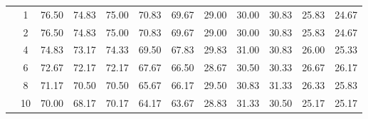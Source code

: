 \begin{table}[htpb]
\begin{tabular}{|c|c|c c c c c|c c c c c|}
\multicolumn{1}{|c|}{ \multirow{6}{*}{\rotatebox[origin=c]{90}{\textbf{K-vizinhos}}} }
&1 & 76.50	&74.83	&75.00	&70.83	&69.67	&29.00	&30.00	&30.83	&25.83	&24.67\\\cline{2-12}
&2 & 76.50	&74.83	&75.00	&70.83	&69.67	&29.00	&30.00	&30.83	&25.83	&24.67\\\cline{2-12}
&4 & 74.83	&73.17	&74.33	&69.50	&67.83	&29.83	&31.00	&30.83	&26.00	&25.33\\\cline{2-12}
&6 & 72.67	&72.17	&72.17	&67.67	&66.50	&28.67	&30.50	&30.33	&26.67	&26.17\\\cline{2-12}
&8 & 71.17	&70.50	&70.50	&65.67	&66.17	&29.50	&30.83	&31.33	&26.33	&25.83\\\cline{2-12}
&10 & 70.00	&68.17	&70.17	&64.17	&63.67	&28.83	&31.33	&30.50	&25.17	&25.17%

\\\midrule

	\end{tabular}
\end{table}







